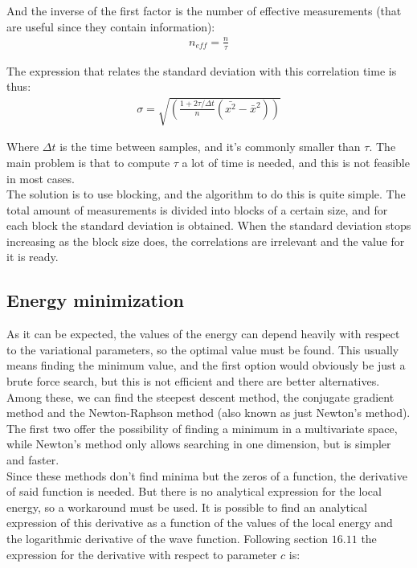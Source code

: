 		And the inverse of the first factor is  the number of effective measurements (that are useful since they contain information):\\

		\begin{align}
			n_{eff}=\frac{n}{\tau}
		\end{align}

		The expression that relates the standard deviation with this correlation time is thus:\\

		\begin{align}
			\sigma=\sqrt{\left(\frac{1+2\tau/\Delta t}{n}\left(\bar{x^2}-\bar{x}^2\right)\right)}
		\end{align}

		Where $\Delta t$ is the time between samples, and it's commonly smaller than $\tau$. The main problem is that to compute $\tau$ a lot of time is needed, and this is not feasible in most cases.\\

		The solution is to use blocking, and the algorithm to do this is quite simple. The total amount of measurements is divided into blocks of a certain size, and for each block the standard deviation is obtained. When the standard deviation stops increasing as the block size does, the correlations are irrelevant and the value for it is ready.\\

	\subsection{Energy minimization}
		As it can be expected, the values of the energy can depend heavily with respect to the variational parameters, so the optimal value must be found. This usually means finding the minimum value, and the first option would obviously be just a brute force search, but this is not efficient and there are better alternatives. Among these, we can find the steepest descent method, the conjugate gradient method and the Newton-Raphson method (also known as just Newton's method). The first two offer the possibility of finding a minimum in a multivariate space, while Newton's method only allows searching in one dimension, but is simpler and faster.\\

		Since these methods don't find minima but the zeros of a function, the derivative of said function is needed. But there is no analytical expression for the local energy, so a workaround must be used. It is possible to find an analytical expression of this derivative as a function of the values of the local energy and the logarithmic derivative of the wave function. Following \parencite{mortens_notes} section $16.11$ the expression for the derivative with respect to parameter $c$ is:\\

